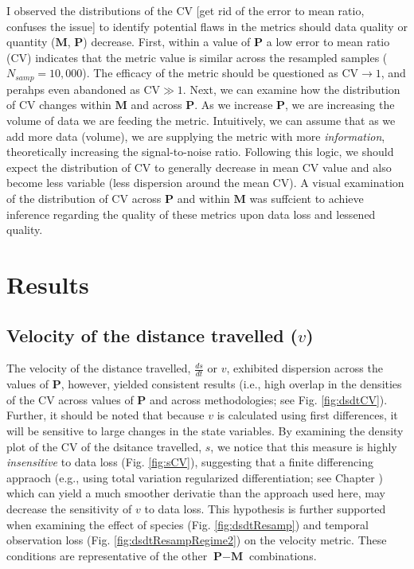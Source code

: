 \documentclass[12pt,twoside,openany]{reedthesis}
\begin{document}
I observed the distributions of the CV {[}get rid of the error to mean ratio, confuses the issue{]} to identify potential flaws in the metrics should data quality or quantity (\(\textbf{M}\), \(\textbf{P}\)) decrease. First, within a value of \(\textbf{P}\) a low error to mean ratio (CV) indicates that the metric value is similar across the resampled samples (\(N_{samp}=10,000\)). The efficacy of the metric should be questioned as CV\(\rightarrow 1\), and perahps even abandoned as CV\(\gg1\). Next, we can examine how the distribution of CV changes within \(\textbf{M}\) and across \(\textbf{P}\). As we increase \(\textbf{P}\), we are increasing the volume of data we are feeding the metric. Intuitively, we can assume that as we add more data (volume), we are supplying the metric with more \emph{information}, theoretically increasing the signal-to-noise ratio. Following this logic, we should expect the distribution of CV to generally decrease in mean CV value and also become less variable (less dispersion around the mean CV). A visual examination of the distribution of CV across \(\textbf{P}\) and within \(\textbf{M}\) was suffcient to achieve inference regarding the quality of these metrics upon data loss and lessened quality.

\hypertarget{results-2}{%
\section{Results}\label{results-2}}

\hypertarget{velocity-of-the-distance-travelled-v}{%
\subsection{\texorpdfstring{Velocity of the distance travelled (\(v\))}{Velocity of the distance travelled (v)}}\label{velocity-of-the-distance-travelled-v}}

The velocity of the distance travelled, \(\frac{ds}{dt}\) or \(v\), exhibited dispersion across the values of \(\textbf{P}\), however, yielded consistent results (i.e., high overlap in the densities of the CV across values of \(\textbf{P}\) and across methodologies; see Fig. \ref{fig:dsdtCV}). Further, it should be noted that because \(v\) is calculated using first differences, it will be sensitive to large changes in the state variables. By examining the density plot of the CV of the dsitance travelled, \(s\), we notice that this measure is highly \emph{insensitive} to data loss (Fig. \ref{fig:sCV}), suggesting that a finite differencing appraoch (e.g., using total variation regularized differentiation; see Chapter ) which can yield a much smoother derivatie than the approach used here, may decrease the sensitivity of \(v\) to data loss. This hypothesis is further supported when examining the effect of species (Fig. \ref{fig:dsdtResamp}) and temporal observation loss (Fig. \ref{fig:dsdtResampRegime2}) on the velocity metric. These conditions are representative of the other \(\textbf{P}-\textbf{M}\) combinations.
\end{document}
